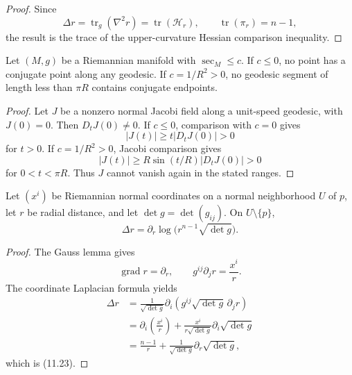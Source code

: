 \begin{proof}
\sketch Since
\[
\Delta r=\operatorname{tr}_g(\nabla^2r)=\operatorname{tr}(\mathcal H_r),
\qquad \operatorname{tr}(\pi_r)=n-1,
\]
the result is the trace of the upper-curvature Hessian comparison inequality.
\end{proof}

\begin{theorem}
\label{thm:conjugate-point-comparison-I}





Let $(M,g)$ be a Riemannian manifold with $\sec_M\leq c$. If $c\leq0$, no
point has a conjugate point along any geodesic. If $c=1/R^2>0$, no geodesic
segment of length less than $\pi R$ contains conjugate endpoints.

\begin{proof}
\sketch Let $J$ be a nonzero normal Jacobi field along a unit-speed geodesic,
with $J(0)=0$. Then $D_tJ(0)\ne0$. If $c\leq0$, comparison with $c=0$ gives
\[
|J(t)|\geq t|D_tJ(0)|>0
\]
for $t>0$. If $c=1/R^2>0$, Jacobi comparison gives
\[
|J(t)|\geq R\sin(t/R)|D_tJ(0)|>0
\]
for $0<t<\pi R$. Thus $J$ cannot vanish again in the stated ranges.
\end{proof}
\end{theorem}

\begin{lemma}
\label{lem:riemannian-volume-laplacian}

Let $(x^i)$ be Riemannian normal coordinates on a normal neighborhood $U$ of
$p$, let $r$ be radial distance, and let $\det g=\det(g_{ij})$. On
$U\setminus\{p\}$,
\begin{equation}
\Delta r=\partial_r\log\bigl(r^{n-1}\sqrt{\det g}\bigr). \tag{11.23}
\end{equation}

\begin{proof}
\sketch The Gauss lemma gives
\[
\operatorname{grad}r=\partial_r,
\qquad
g^{ij}\partial_jr=\frac{x^i}{r}.
\]
The coordinate Laplacian formula yields
\begin{align*}
\Delta r
&=\frac1{\sqrt{\det g}}
  \partial_i\left(g^{ij}\sqrt{\det g}\,\partial_jr\right)\\
&=\partial_i\left(\frac{x^i}{r}\right)
  +\frac{x^i}{r\sqrt{\det g}}\partial_i\sqrt{\det g}\\
&=\frac{n-1}{r}
  +\frac1{\sqrt{\det g}}\partial_r\sqrt{\det g},
\end{align*}
which is (11.23).
\end{proof}
\end{lemma}

